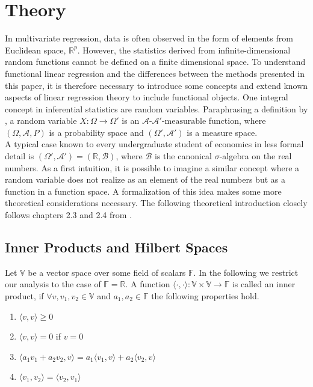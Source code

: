 \documentclass[11pt,twoside,a4paper]{article}
\begin{document}
	\section{Theory}
	In multivariate regression, data is often observed in the form of elements from Euclidean space, $\mathbb{R}^p$. However, the statistics derived from infinite-dimensional random functions cannot be defined on a finite dimensional space. To understand functional linear regression and the differences between the methods presented in this paper, it is therefore necessary to introduce some concepts and extend known aspects of linear regression theory to include functional objects. One integral concept in inferential statistics are random variables. Paraphrasing a definition by \cite{bauer_wahrscheinlichkeitstheorie_2020}, a random variable $X:\Omega \rightarrow \Omega'$ is an $\mathcal{A} \text{-} \mathcal{A'} \text{-measurable}$ function, where $(\Omega, \mathcal{A}, P)$ is a probability space and $(\Omega', \mathcal{A'})$ is a measure space.\\
	A typical case known to every undergraduate student of economics in less formal detail is $(\Omega', \mathcal{A'}) = (\mathbb{R}, \mathcal{B})$, where $\mathcal{B}$ is the canonical $\sigma$-algebra on the real numbers. As a first intuition, it is possible to imagine a similar concept where a random variable does not realize as an element of the real numbers but as a function in a function space. A formalization of this idea makes some more theoretical considerations necessary. The following theoretical introduction closely follows chapters 2.3 and 2.4 from \cite{hsing_theoretical_2015}. 
	
	\subsection{Inner Products and Hilbert Spaces}
	Let $\mathbb{V}$ be a vector space over some field of scalars $\mathbb{F}$. In the following we restrict our analysis to the case of $\mathbb{F} = \mathbb{R}$. A function $\langle \cdot, \cdot \rangle : \mathbb{V} \times  \mathbb{V} \rightarrow \mathbb{F}$ is called an inner product, if $\forall v, v_1, v_2 \in \mathbb{V}$ and $a_1, a_2 \in \mathbb{F}$ the following properties hold.
	
	\begin{multicols}{2}
		\begin{enumerate}
			\item $\langle v, v \rangle \geq 0$
			\item $\langle v, v \rangle = 0$ if $v = 0$
			\item $\langle a_1 v_1 + a_2 v_2, v \rangle = a_1 \langle v_1, v \rangle + a_2 \langle v_2, v \rangle$
			\item $\langle v_1, v_2 \rangle = \langle v_2, v_1 \rangle$
		\end{enumerate}
	\end{multicols}
\end{document}
